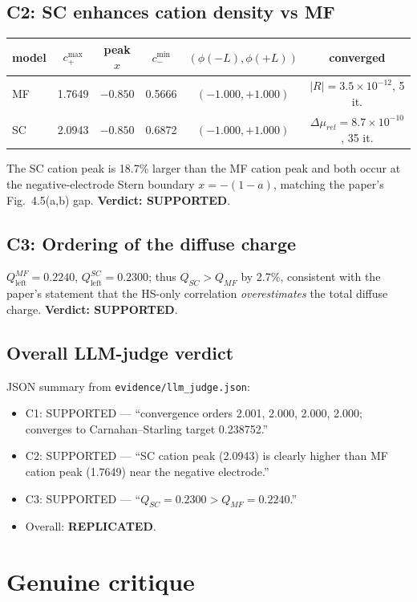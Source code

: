 \documentclass[11pt]{article}
\begin{document}
\subsection{C2: SC enhances cation density vs MF}
\begin{center}
\begin{tabular}{@{}lccccc@{}}
\toprule
model & $c_+^{\max}$ & peak $x$ & $c_-^{\min}$ & $(\phi(-L),\phi(+L))$ & converged \\
\midrule
MF & 1.7649 & $-0.850$ & 0.5666 & $(-1.000,+1.000)$ & $|R|=3.5\!\times\!10^{-12}$, 5 it. \\
SC & 2.0943 & $-0.850$ & 0.6872 & $(-1.000,+1.000)$ & $\Delta\mu_{rel}=8.7\!\times\!10^{-10}$, 35 it. \\
\bottomrule
\end{tabular}
\end{center}
The SC cation peak is 18.7\% larger than the MF cation peak and both
occur at the negative-electrode Stern boundary $x=-(1-a)$, matching
the paper's Fig.~4.5(a,b) gap. \textbf{Verdict: SUPPORTED}.

\subsection{C3: Ordering of the diffuse charge}
$Q^{MF}_{\text{left}}=0.2240$, $Q^{SC}_{\text{left}}=0.2300$; thus
$Q_{SC}>Q_{MF}$ by 2.7\%, consistent with the paper's statement that
the HS-only correlation \emph{overestimates} the total diffuse
charge. \textbf{Verdict: SUPPORTED}.

\subsection{Overall LLM-judge verdict}
JSON summary from \texttt{evidence/llm\_judge.json}:
\begin{itemize}
\item C1: SUPPORTED --- ``convergence orders 2.001, 2.000, 2.000, 2.000; converges to Carnahan--Starling target 0.238752.''
\item C2: SUPPORTED --- ``SC cation peak (2.0943) is clearly higher than MF cation peak (1.7649) near the negative electrode.''
\item C3: SUPPORTED --- ``$Q_{SC}=0.2300>Q_{MF}=0.2240$.''
\item Overall: \textbf{REPLICATED}.
\end{itemize}

\section{Genuine critique}
\end{document}
